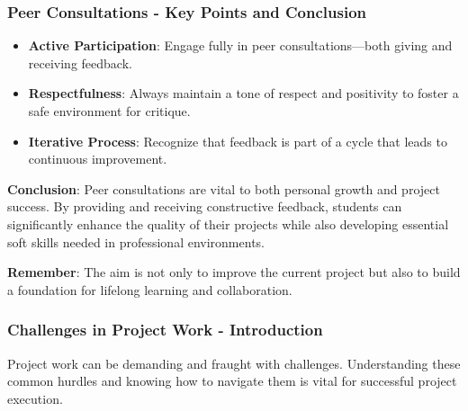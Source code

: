 \documentclass[aspectratio=169]{beamer}
\begin{document}
\begin{frame}[fragile]
    \frametitle{Peer Consultations - Key Points and Conclusion}
    
    \begin{itemize}
        \item \textbf{Active Participation}: Engage fully in peer consultations—both giving and receiving feedback.
        \item \textbf{Respectfulness}: Always maintain a tone of respect and positivity to foster a safe environment for critique.
        \item \textbf{Iterative Process}: Recognize that feedback is part of a cycle that leads to continuous improvement.
    \end{itemize}
    
    \textbf{Conclusion}: Peer consultations are vital to both personal growth and project success. By providing and receiving constructive feedback, students can significantly enhance the quality of their projects while also developing essential soft skills needed in professional environments.
    
    \textbf{Remember}: The aim is not only to improve the current project but also to build a foundation for lifelong learning and collaboration.
\end{frame}

\begin{frame}[fragile]
  \frametitle{Challenges in Project Work - Introduction}
  Project work can be demanding and fraught with challenges. Understanding these common hurdles and knowing how to navigate them is vital for successful project execution.
\end{frame}
\end{document}
